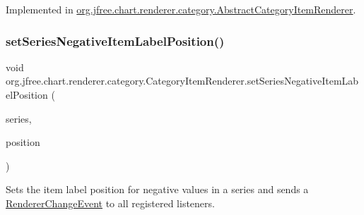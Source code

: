 Implemented in \mbox{\hyperlink{classorg_1_1jfree_1_1chart_1_1renderer_1_1category_1_1_abstract_category_item_renderer_a8bd0eb808e40ecf16e77228655a0a99d}{org.\+jfree.\+chart.\+renderer.\+category.\+Abstract\+Category\+Item\+Renderer}}.

\mbox{\label{interfaceorg_1_1jfree_1_1chart_1_1renderer_1_1category_1_1_category_item_renderer_ae3201c328eb9526f806b12183f187742}} 
\subsubsection{\texorpdfstring{set\+Series\+Negative\+Item\+Label\+Position()}{setSeriesNegativeItemLabelPosition()}\hspace{0.1cm}{\footnotesize\ttfamily [1/2]}}
{\footnotesize\ttfamily void org.\+jfree.\+chart.\+renderer.\+category.\+Category\+Item\+Renderer.\+set\+Series\+Negative\+Item\+Label\+Position (\begin{DoxyParamCaption}\item[{int}]{series,  }\item[{\mbox{\hyperlink{classorg_1_1jfree_1_1chart_1_1labels_1_1_item_label_position}{Item\+Label\+Position}}}]{position }\end{DoxyParamCaption})}

Sets the item label position for negative values in a series and sends a \mbox{\hyperlink{}{Renderer\+Change\+Event}} to all registered listeners.


